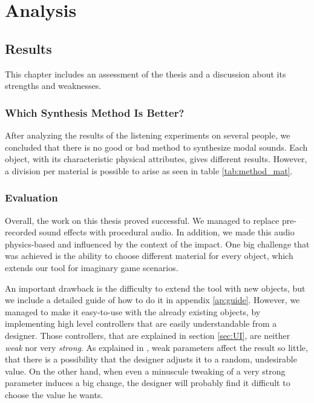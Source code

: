 \chapter{Analysis}\label{ch:analysis}

\section{Results}
This chapter includes an assessment of the thesis and a discussion about its strengths and weaknesses.  

\subsection{Which Synthesis Method Is Better?}
After analyzing the results of the listening experiments on several people, we concluded that there is no good or bad method to synthesize modal sounds. Each object, with its characteristic physical attributes, gives different results. However, a division per material is possible to arise as seen in table \ref{tab:method_mat}.

\subsection{Evaluation}

Overall, the work on this thesis proved successful. We managed to replace pre-recorded sound effects with procedural audio. In addition, we made this audio physics-based and influenced by the context of the impact. One big challenge that was achieved is the ability to choose different material for every object, which extends our tool for imaginary game scenarios.

An important drawback is the difficulty to extend the tool with new objects, but we include a detailed guide of how to do it in appendix \ref{ap:guide}. However, we managed to make it easy-to-use with the already existing objects, by implementing high level controllers that are easily understandable from a designer. Those controllers, that are explained in section \ref{sec:UI}, are neither \textit{weak} nor very \textit{strong}. As explained in \cite{jaffe1995ten}, weak parameters affect the result so little, that there is a possibility that the designer adjusts it to a random, undesirable value. On the other hand, when even a minuscule tweaking of a very strong parameter induces a big change, the designer  will probably find it difficult to choose the value he wants.

